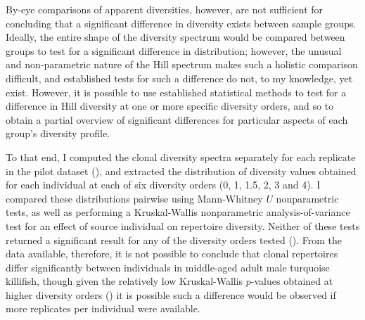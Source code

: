 By-eye comparisons of apparent diversities, however, are not sufficient for concluding that a significant difference in diversity exists between sample groups. Ideally, the entire shape of the diversity spectrum would be compared between groups to test for a significant difference in distribution; however, the unusual and non-parametric nature of the Hill spectrum makes such a holistic comparison difficult, and established tests for such a difference do not, to my knowledge, yet exist. However, it is possible to use established statistical methods to test for a difference in Hill diversity at one or more specific diversity orders, and so to obtain a partial overview of significant differences for particular aspects of each group's diversity profile. 

To that end, I computed the clonal diversity spectra separately for each replicate in the pilot dataset (), and extracted the distribution of diversity values obtained for each individual at each of six diversity orders (0, 1, 1.5, 2, 3 and 4). I compared these distributions pairwise using Mann-Whitney $U$ nonparametric tests, as well as performing a Kruskal-Wallis nonparametric analysis-of-variance test for an effect of source individual on repertoire diversity. Neither of these tests returned a significant result for any of the diversity orders tested (). From the data available, therefore, it is not possible to conclude that clonal repertoires differ significantly between individuals in middle-aged adult male turquoise killifish, though given the relatively low Kruskal-Wallis $p$-values obtained at higher diversity orders () it is possible such a difference would be observed if more replicates per individual were available.

